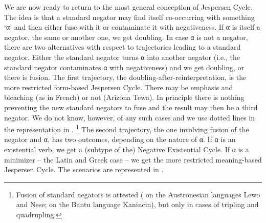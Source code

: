 ﻿\documentclass[output=paper]{langsci/langscibook}
\begin{document}
We are now ready to return to the most general conception of Jespersen
Cycle. The idea is that a standard negator may find itself co-occurring
with something `α' and then either fuse with it or contaminate it with
negativeness. If α is itself a negator, the same or another one, we get
doubling. In case α is not a negator, there are two alternatives with
respect to trajectories leading to a standard negator. Either the standard
negator turns α into another negator (i.e., the standard negator
contaminates α with negativeness) and we get doubling, or there is fusion.
The first trajectory, the doubling-after-reinterpretation, is the more
restricted form-based Jespersen Cycle. There may be emphasis and bleaching
(as in French) or not (Arizona Tewa). In principle there is nothing
preventing the new standard negators to fuse and the result may then be a
third negator. We do not know, however, of any such cases and we use dotted
lines in the representation in .%
%
\footnote{Fusion of standard
negators is attested (\citealt[18]{Vossen2016} on the Austronesian
languages Lewo and Nese; \citealt{DevosTshibanda2010} on the Bantu language
Kanincin), but only in cases of tripling and quadrupling.} %
%
The second trajectory, the one involving fusion of the negator and α, has
two outcomes, depending on the nature of α. If α is an existential verb, we
get a (subtype of the) Negative Existential Cycle. If α is a minimizer --
the Latin and Greek case -- we get the more restricted
meaning-based Jespersen Cycle. The scenarios are represented in
.
%
\end{document}
